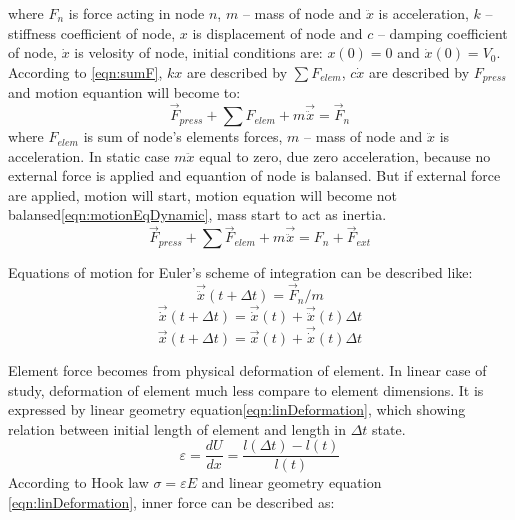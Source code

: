 where $F_n$ is force acting in node $n$, $m$ – mass of node and $\ddot{x}$ is acceleration, $k$ –
stiffness coefficient of node, $x$ is displacement of node and $c$ – damping coefficient of node,
$\dot{x}$ is velosity of node, initial conditions are: $x(0)=0$ and $\dot{x}(0)=V_0$. According to
\ref{eqn:sumF}, $kx$ are described by $\sum{F_{elem}}$, $c\dot{x}$ are described by $F_{press}$ and
motion equantion will become to:
\begin{equation}\label{eqn:motionEqNodeStatic}
  \vec{F}_{press} + \sum{F_{elem}} + m\vec{\ddot{x}} = \vec{F}_n
\end{equation}
where $F_{elem}$ is sum of node's elements forces, $m$ – mass of node and $\ddot{x}$ is
acceleration. In static case $m\ddot{x}$ equal to zero, due zero acceleration, because no external
force is applied and equantion of node is balansed. But if external force are applied, motion will
start, motion equation will become not balansed\ref{eqn:motionEqDynamic}, mass start to act as inertia. 
\begin{equation}\label{eqn:motionEqDynamic}
  \vec{F}_{press} + \sum\vec{F}_{elem} + m\vec{\ddot{x}} = F_n + \vec{F}_{ext}
\end{equation}\par 
Equations of motion for Euler's scheme of integration can be described like:
\begin{equation}\label{eqn:Accel}
  \vec{\ddot{x}}(t +\Delta t)=\vec{F}_n/m
\end{equation}
\begin{equation}\label{eqn:Velos}
  \vec{\dot{x}}(t +\Delta t)=\vec{\dot{x}}(t)+\vec{\ddot{x}}(t)\Delta t
\end{equation}
\begin{equation}\label{eqn:Displ}
  \vec{x}(t +\Delta t)=\vec{x}(t)+\vec{\dot{x}}(t)\Delta t
\end{equation}
\par Element force becomes from physical deformation of
element. In linear case of study, deformation of element much less compare to
element dimensions. It is expressed by linear geometry
equation\eqref{eqn:linDeformation}, which showing relation between initial
length of element and length in $\Delta t$ state.
\begin{equation}\label{eqn:linDeformation}
  \varepsilon=\frac{dU}{dx}=\frac{l(\Delta t)-l(t)}{l(t)}
\end{equation}
According to Hook law $\sigma=\varepsilon E$ and linear geometry equation
\eqref{eqn:linDeformation}, inner force can be described as:

